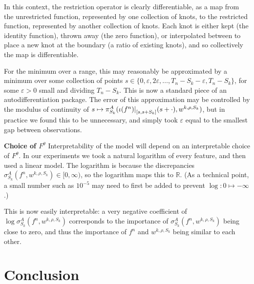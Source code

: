 \documentclass{article}
\theoremstyle{plain}
\theoremstyle{definition}
\newcommand{\reals}{\mathbb{R}}
\newcommand{\restr}[2]{{\left.\kern-\nulldelimiterspace #1 \right|_{#2}}}
\newcommand{\boldheading}[1]{

\textbf{#1}\quad}
\begin{document}
	In this context, the restriction operator is clearly differentiable, as a map from the unrestricted function, represented by one collection of knots, to the restricted function, represented by another collection of knots. Each knot is either kept (the identity function), thrown away (the zero function), or interpolated between to place a new knot at the boundary (a ratio of existing knots), and so collectively the map is differentiable.
	
	For the minimum over a range, this may reasonably be approximated by a minimum over some collection of points $s \in \{0, \varepsilon, 2 \varepsilon, \ldots, T_n - S_k - \varepsilon, T_n - S_k\}$, for some $\varepsilon > 0$ small and dividing $T_n - S_k$. This is now a standard piece of an autodifferentiation package. The error of this approximation may be controlled by the modulus of continuity of $s \mapsto \pi^A_{S_k}(\restr{\iota(f^n)}{[s, s + S_k]}(s + \cdot), w^{k, \rho, S_k})$, but in practice we found this to be unnecessary, and simply took $\varepsilon$ equal to the smallest gap between observations.
	
	\boldheading{Choice of $F^\theta$}
	Interpretability of the model will depend on an interpretable choice of $F^\theta$. In our experiments we took a natural logarithm of every feature, and then used a linear model. The logarithm is because the discrepancies $\sigma^A_{S_k}(f^n, w^{k, \rho, S_k}) \in [0, \infty)$, so the logarithm maps this to $\reals$. (As a technical point, a small number such as $10^{-5}$ may need to first be added to prevent $\log \colon 0 \mapsto -\infty$.)
	
	This is now easily interpretable: a very negative coefficient of $\log \sigma^A_{S_k}(f^n, w^{k, \rho, S_k})$ corresponds to the importance of $\sigma^A_{S_k}(f^n, w^{k, \rho, S_k})$ being close to zero, and thus the importance of $f^n$ and $w^{k, \rho, S_k}$ being similar to each other.
	
	
	


	\section{Conclusion}
\end{document}
